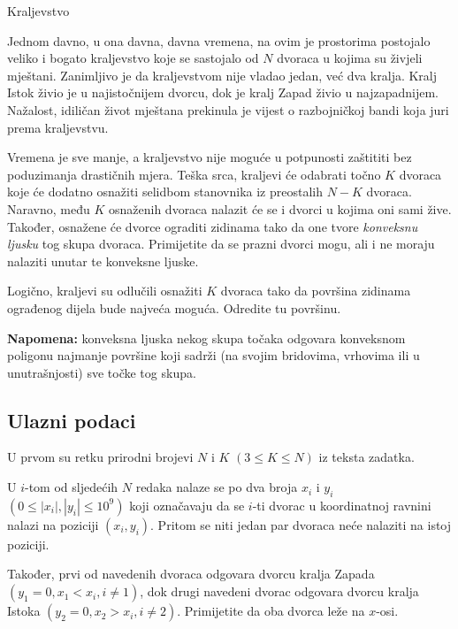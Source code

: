 \begin{statement}[
  problempoints=100,
  timelimit=1 sekunda,
  memorylimit=512 MiB,
]{Kraljevstvo}

Jednom davno, u ona davna, davna vremena, na ovim je prostorima postojalo
veliko i bogato kraljevstvo koje se sastojalo od $N$ dvoraca u kojima su živjeli
mještani. Zanimljivo je da kraljevstvom nije vladao jedan, već dva kralja.
Kralj Istok živio je u najistočnijem dvorcu, dok je kralj Zapad živio u
najzapadnijem. Nažalost, idiličan život mještana prekinula je vijest o
razbojničkoj bandi koja juri prema kraljevstvu.

Vremena je sve manje, a kraljevstvo nije moguće u potpunosti zaštititi bez
poduzimanja drastičnih mjera. Teška srca, kraljevi će odabrati točno $K$
dvoraca koje će dodatno osnažiti selidbom stanovnika iz preostalih $N - K$
dvoraca. Naravno, među $K$ osnaženih dvoraca nalazit će se i dvorci u kojima
oni sami žive.  Također, osnažene će dvorce ograditi zidinama tako da one
tvore \textit{konveksnu ljusku} tog skupa dvoraca. Primijetite da se prazni
dvorci mogu, ali i ne moraju nalaziti unutar te konveksne ljuske.

Logično, kraljevi su odlučili osnažiti $K$ dvoraca tako da površina zidinama
ograđenog dijela bude najveća moguća. Odredite tu površinu.

\textbf{Napomena:} konveksna ljuska nekog skupa točaka odgovara konveksnom
poligonu najmanje površine koji sadrži (na svojim bridovima, vrhovima ili
u unutrašnjosti) sve točke tog skupa.

\subsection*{Ulazni podaci}
U prvom su retku prirodni brojevi $N$ i $K$ $(3 \le K \le N)$ iz teksta zadatka.

U $i$-tom od sljedećih $N$ redaka nalaze se po dva broja $x_i$ i $y_i$ $(0 \leq
|x_i|, |y_i| \leq 10^9)$ koji označavaju da se $i$-ti dvorac u koordinatnoj
ravnini nalazi na poziciji $(x_i, y_i)$. Pritom se niti jedan par dvoraca neće
nalaziti na istoj poziciji.

Također, prvi od navedenih dvoraca odgovara dvorcu kralja Zapada $(y_1 = 0, x_1
< x_i, i \ne 1)$, dok drugi navedeni dvorac odgovara dvorcu kralja Istoka
$(y_2 = 0, x_2 > x_i, i \ne 2)$. Primijetite da oba dvorca leže na $x$-osi.


\end{statement}
